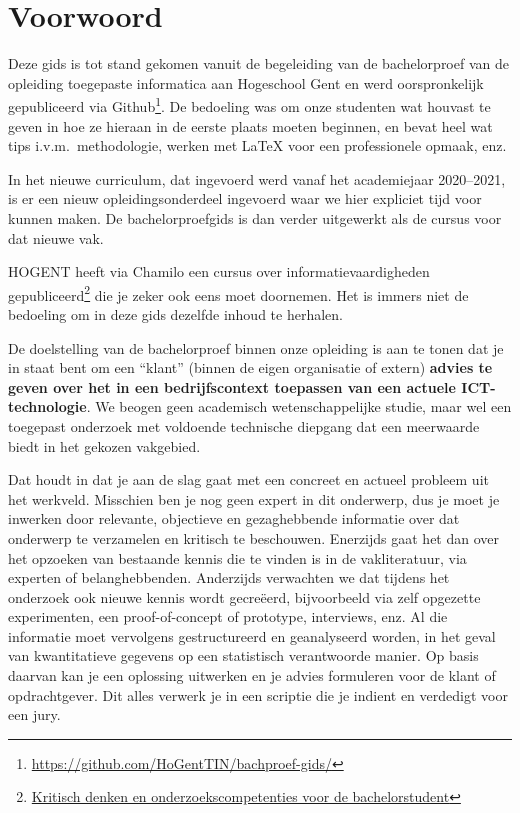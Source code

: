 \chapter*{Voorwoord}%
\label{ch:voorwoord}

Deze gids is tot stand gekomen vanuit de begeleiding van de bachelorproef van de opleiding toegepaste informatica aan Hogeschool Gent en werd oorspronkelijk gepubliceerd via Github\footnote{\url{https://github.com/HoGentTIN/bachproef-gids/}}. De bedoeling was om onze studenten wat houvast te geven in hoe ze hieraan in de eerste plaats moeten beginnen, en bevat heel wat tips i.v.m.\ methodologie, werken met {\LaTeX} voor een professionele opmaak, enz.

In het nieuwe curriculum, dat ingevoerd werd vanaf het academiejaar 2020--2021, is er een nieuw opleidingsonderdeel ingevoerd waar we hier expliciet tijd voor kunnen maken. De bachelorproefgids is dan verder uitgewerkt als de cursus voor dat nieuwe vak.

HOGENT heeft via Chamilo een cursus over informatievaardigheden gepubliceerd\footnote{\href{https://chamilo.hogent.be/index.php?go=CourseViewer&application=Chamilo\%5CApplication\%5CWeblcms&course=22068}{Kritisch denken en onderzoekscompetenties voor de bachelorstudent}} die je zeker ook eens moet doornemen. Het is immers niet de bedoeling om in deze gids dezelfde inhoud te herhalen.

De doelstelling van de bachelorproef binnen onze opleiding is aan te tonen dat je in staat bent om een ``klant'' (binnen de eigen organisatie of extern) \textbf{advies te geven over het in een bedrijfscontext toepassen van een actuele ICT-technologie}. We beogen geen academisch wetenschappelijke studie, maar wel een toegepast onderzoek met voldoende technische diepgang dat een meerwaarde biedt in het gekozen vakgebied.

Dat houdt in dat je aan de slag gaat met een concreet en actueel probleem uit het werkveld. Misschien ben je nog geen expert in dit onderwerp, dus je moet je inwerken door relevante, objectieve en gezaghebbende informatie over dat onderwerp te verzamelen en kritisch te beschouwen. Enerzijds gaat het dan over het opzoeken van bestaande kennis die te vinden is in de vakliteratuur, via experten of belanghebbenden. Anderzijds verwachten we dat tijdens het onderzoek ook nieuwe kennis wordt gecreëerd, bijvoorbeeld via zelf opgezette experimenten, een proof-of-concept of prototype, interviews, enz. Al die informatie moet vervolgens gestructureerd en geanalyseerd worden, in het geval van kwantitatieve gegevens op een statistisch verantwoorde manier. Op basis daarvan kan je een oplossing uitwerken en je advies formuleren voor de klant of opdrachtgever. Dit alles verwerk je in een scriptie die je indient en verdedigt voor een jury.

